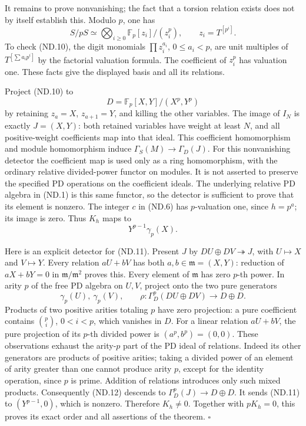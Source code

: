 It remains to prove nonvanishing; the fact that a torsion relation
exists does not by itself establish this. Modulo \(p\), one has
\[
 S/pS\simeq\bigotimes_{i\geq0}
       \mathbb F_p[z_i]/(z_i^p),\qquad z_i=T^{[p^i]}.
                                                               \tag{ND.10}
\]
To check (ND.10), the digit monomials
\(\prod z_i^{a_i}\), \(0\leq a_i<p\), are unit multiples
of \(T^{[\sum a_ip^i]}\) by the factorial valuation formula.
The coefficient of \(z_i^p\) has valuation one. These facts
give the displayed basis and all its relations.

Project (ND.10) to
\[
 D=\mathbb F_p[X,Y]/(X^p,Y^p)
\]
by retaining \(z_a=X\), \(z_{a+1}=Y\), and killing the other
variables. The image of \(I_N\) is exactly \(J=(X,Y)\):
both retained variables have weight at least \(N\), and all
positive-weight coefficients map into that ideal.
This coefficient homomorphism and module homomorphism induce
\(\Gamma_S(M)\to\Gamma_D(J)\).
For this nonvanishing detector the coefficient map is used only
as a ring homomorphism, with the ordinary relative divided-power
functor on modules. It is not asserted to preserve the specified
PD operations on the coefficient ideals. The underlying relative
PD algebra in (ND.1) is this same functor, so the detector is
sufficient to prove that its element is nonzero.
The integer \(c\) in (ND.6) has \(p\)-valuation one, since
\(h=p^a\); its image is zero. Thus \(K_h\) maps to
\[
                         Y^{p-1}\gamma_p(X) .             \tag{ND.11}
\]

Here is an explicit detector for (ND.11). Present \(J\) by
\(D U\oplus D V\twoheadrightarrow J\), with \(U\mapsto X\)
and \(V\mapsto Y\). Every relation \(aU+bV\) has both
\(a,b\in\mathfrak m=(X,Y)\): reduction of
\(aX+bY=0\) in \(\mathfrak m/\mathfrak m^2\) proves this.
Every element of \(\mathfrak m\) has zero \(p\)-th power.
In arity \(p\) of the free PD algebra on \(U,V\), project
onto the two pure generators
\[
            \gamma_p(U),\ \gamma_p(V),
 \qquad
 \rho:\Gamma_D^p(DU\oplus DV)\longrightarrow D\oplus D.
                                                               \tag{ND.12}
\]
Products of two positive arities totaling \(p\) have zero
projection: a pure coefficient contains
\(\binom pi\), \(0<i<p\), which vanishes in \(D\).
For a linear relation \(aU+bV\), the pure projection of its
\(p\)-th divided power is \((a^p,b^p)=(0,0)\).
These observations exhaust the arity-\(p\) part of the PD
ideal of relations. Indeed its other generators are products
of positive arities; taking a divided power of an element of
arity greater than one cannot produce arity \(p\), except for
the identity operation, since \(p\) is prime. Addition of
relations introduces only such mixed products.
Consequently (ND.12) descends to
\(\Gamma_D^p(J)\to D\oplus D\).
It sends (ND.11) to \((Y^{p-1},0)\), which is nonzero.
Therefore \(K_h\neq0\). Together with \(pK_h=0\), this proves
its exact order and all assertions of the theorem.
\(\square\)

